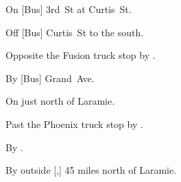 
\begin{LocationList}

On [Bus] 3rd~St at Curtis~St.

Off [Bus] Curtis~St to the south.

Opposite the Fusion truck stop by  .

By [Bus] Grand~Ave.

On   just north of Laramie.

Past the Phoenix truck stop by  .

\Location{\TruckStop \Gas \Rest \Service \Weigh}
By  .

By  outside [,] 45 miles north of Laramie.

\end{LocationList}
